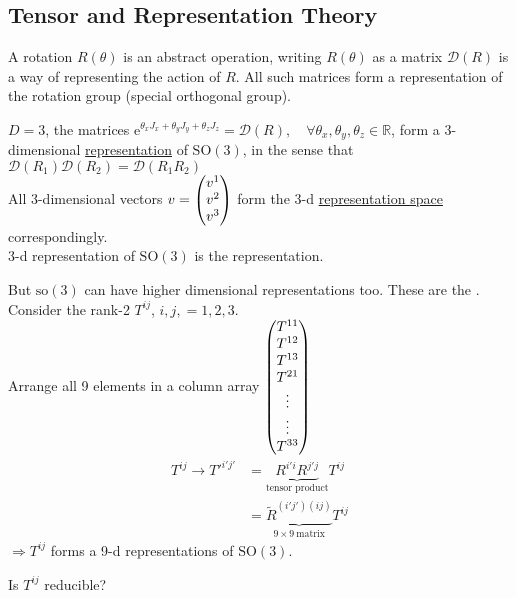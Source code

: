 \documentclass[11pt,fleqn]{book} %
\begin{document}
\subsection{Tensor and Representation Theory}
A rotation \(R(\theta)\) is an abstract operation, writing \(R(\theta)\) as a
matrix \(\mathcal{D}(R)\) is a way of representing the action of \(R\). All such matrices
form a representation of the rotation group (special orthogonal group).
\begin{example}
  \(D = 3\), the matrices \(\mathrm{e}^{\theta_x J_x + \theta_y J_y + \theta_z
    J_z} = \mathcal{D}(R), \quad \forall \theta_x, \theta_y, \theta_z \in
  \mathbb{R}\), form a 3-dimensional \uline{representation} of
  \(\textrm{SO}(3)\), in the sense that \(\mathcal{D}(R_1) \mathcal{D}(R_2) =
  \mathcal{D}(R_1 R_2)\) \\
  All 3-dimensional vectors \(v = \mqty(v^1 \\ v^2 \\
  v^3)\) form the 3-d \uline{representation space} correspondingly. \\
  3-d representation of \(\textrm{SO}(3)\) is the  representation.
\end{example}
But \(\mathrm{so}(3)\) can have higher dimensional representations too.
These are the .\\
Consider the rank-2 \(T^{ij}\), \(i,j,=1,2,3\). \\
Arrange all 9 elements in a column array \(\mqty(T^{11} \\ T^{12} \\ T^{13} \\
T^{21} \\ \vdots \\ \vdots \\ T^{33})\)
\begin{align*}
  T^{ij} \to T'^{i'j'} &= \underbrace{R^{i'i} R^{j'j}}_{\text{tensor product}} T^{ij} \\
  &= \underbrace{\tilde{R}^{(i'j')(ij)}}_{9 \times 9\ \text{matrix}} T^{ij}
\end{align*}
\(\Rightarrow T^{ij}\) forms a 9-d representations of \(\mathrm{SO}(3)\).
\begin{problem}
  Is \(T^{ij}\) reducible?
\end{problem}
\end{document}
